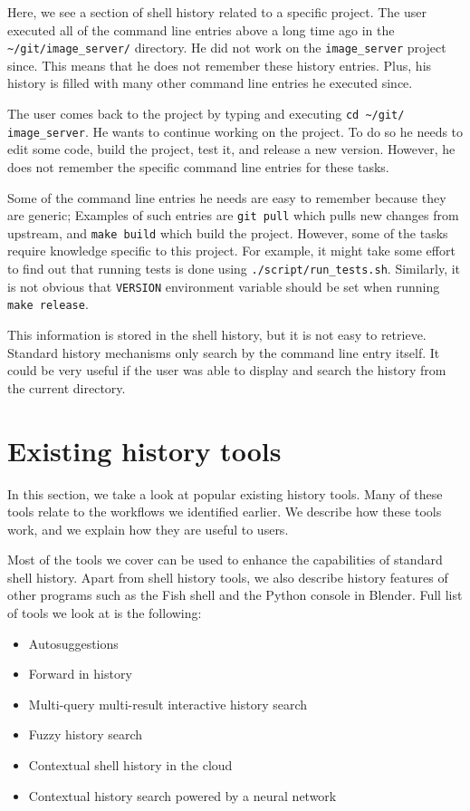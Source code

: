 Here, we see a section of shell history related to a specific project. The user executed all of the command line entries above a long time ago in the \verb|~/git/image_server/| directory. He did not work on the \verb|image_server| project since. This means that he does not remember these history entries. Plus, his history is filled with many other command line entries he executed since.

The user comes back to the project by typing and executing \verb|cd ~/git/| \verb|image_server|. He wants to continue working on the project. To do so he needs to edit some code, build the project, test it, and release a new version. However, he does not remember the specific command line entries for these tasks. 

Some of the command line entries he needs are easy to remember because they are generic; Examples of such entries are \verb|git pull| which pulls new changes from upstream, and \verb|make build| which build the project. However, some of the tasks require knowledge specific to this project. For example, it might take some effort to find out that running tests is done using \verb|./script/run_tests.sh|. Similarly, it is not obvious that \verb|VERSION| environment variable should be set when running \verb|make release|.

This information is stored in the shell history, but it is not easy to retrieve. Standard history mechanisms only search by the command line entry itself. It could be very useful if the user was able to display and search the history from the current directory.


\section{Existing history tools}

In this section, we take a look at popular existing history tools. Many of these tools relate to the workflows we identified earlier. We describe how these tools work, and we explain how they are useful to users. 

Most of the tools we cover can be used to enhance the capabilities of standard shell history. Apart from shell history tools, we also describe history features of other programs such as the Fish shell\cite{fishdocs} and the Python console in Blender\cite{tools-blender-docs-python-console}. Full list of tools we look at is the following:

\begin{itemize}
    \item Autosuggestions
    \item Forward in history
    \item Multi-query multi-result interactive history search
    \item Fuzzy history search
    \item Contextual shell history in the cloud
    \item Contextual history search powered by a neural network
\end{itemize}


